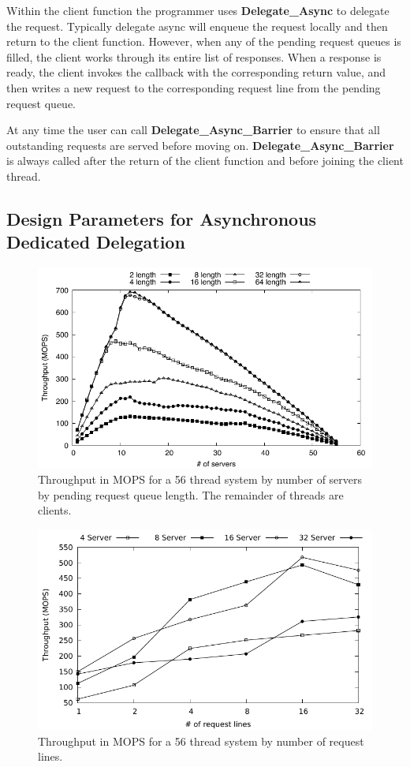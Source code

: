 \documentclass{uicthesi}
\begin{document}
Within the client function the programmer uses \textbf{Delegate\_Async} to delegate the request. Typically delegate async will enqueue the request locally and then return to the client function. However, when any of the pending request queues is filled, the client works through its entire list of responses. When a response is ready, the client invokes the callback with the corresponding return value, and then writes a new request to the corresponding request line from the pending request queue. 

At any time the user can call \textbf{Delegate\_Async\_Barrier} to ensure that all outstanding requests are served before moving on.  \textbf{Delegate\_Async\_Barrier} is always called after the return of the client function and before joining the client thread. 

\subsection{Design Parameters for Asynchronous Dedicated Delegation}
\begin{figure}[ht!]
\centering
\includegraphics[width=0.9\columnwidth]{FIG/vary_queue_length.pdf}
\caption{Throughput in MOPS for a 56 thread system by number of servers by pending request queue length. The remainder of threads are clients.}
\label{fig:dedicated_vary_queue}
\end{figure}

\begin{figure}[ht!]
\centering
\includegraphics[width=0.9\columnwidth]{FIG/thput_by_rl.pdf}
\caption{Throughput in MOPS for a 56 thread system by number of request lines. }
\label{fig:dedicated_thput_by_rl}
\end{figure}
\end{document}
